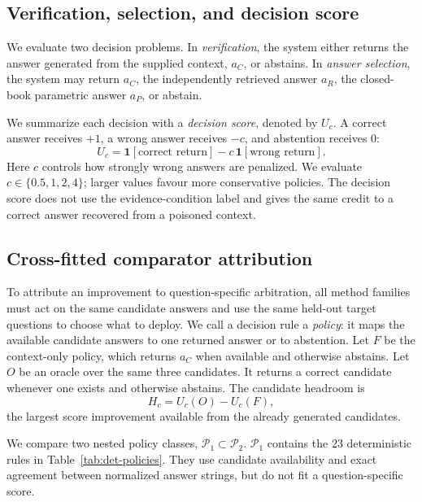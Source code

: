 \documentclass[sigconf]{acmart}
\newcommand{\uc}{U_c}
\newcommand{\ac}{a_C}
\newcommand{\ar}{a_R}
\newcommand{\ap}{a_P}
\begin{document}
\subsection{Verification, selection, and decision score}

We evaluate two decision problems. In \emph{verification}, the system
either returns the answer generated from the supplied context, $\ac$,
or abstains. In \emph{answer selection}, the system may return $\ac$,
the independently retrieved answer $\ar$, the closed-book parametric
answer $\ap$, or abstain.

We summarize each decision with a \emph{decision score}, denoted by
$U_c$. A correct answer receives $+1$, a wrong answer receives $-c$,
and abstention receives $0$:
\begin{equation}
  \uc =
  \mathbf{1}[\text{correct return}]
  - c\,\mathbf{1}[\text{wrong return}].
  \label{eq:utility}
\end{equation}
Here $c$ controls how strongly wrong answers are penalized. We evaluate
$c\in\{0.5,1,2,4\}$; larger values favour more conservative
policies. The decision score does not use the evidence-condition label
and gives the same credit to a correct answer recovered from a poisoned
context.

\subsection{Cross-fitted comparator attribution}
\label{sec:attribution}

To attribute an improvement to question-specific arbitration, all
method families must act on the same candidate answers and use the same
held-out target questions to choose what to deploy. We call a decision
rule a \emph{policy}: it maps the available candidate answers to one
returned answer or to abstention. Let $F$ be the context-only policy,
which returns $\ac$ when available and otherwise abstains. Let $O$ be an
oracle over the same three candidates. It returns a correct candidate
whenever one exists and otherwise abstains. The candidate headroom is
\begin{equation}
  H_c = U_c(O)-U_c(F),
\end{equation}
the largest score improvement available from the already generated
candidates.

We compare two nested policy classes,
$\mathcal{P}_1\subset\mathcal{P}_2$.
$\mathcal{P}_1$ contains the $23$ deterministic rules in
Table~\ref{tab:det-policies}. They use candidate availability and exact
agreement between normalized answer strings, but do not fit a
question-specific score.
\end{document}
